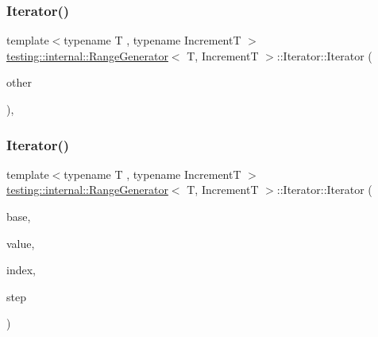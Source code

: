 \mbox{\label{classtesting_1_1internal_1_1_range_generator_1_1_iterator_a14150df56c79ae26f1beaea1e7548ebc}} 
\subsubsection{\texorpdfstring{Iterator()}{Iterator()}\hspace{0.1cm}{\footnotesize\ttfamily [4/6]}}
{\footnotesize\ttfamily template$<$typename T , typename IncrementT $>$ \\
\mbox{\hyperlink{classtesting_1_1internal_1_1_range_generator}{testing\+::internal\+::\+Range\+Generator}}$<$ T, IncrementT $>$\+::Iterator\+::\+Iterator (\begin{DoxyParamCaption}\item[{const \mbox{\hyperlink{classtesting_1_1internal_1_1_range_generator_1_1_iterator}{Iterator}} \&}]{other }\end{DoxyParamCaption})\hspace{0.3cm}{\ttfamily [inline]}, {\ttfamily [private]}}

\mbox{\label{classtesting_1_1internal_1_1_range_generator_1_1_iterator_a960184d2ea0ff223d9cf4d6ab015baa8}} 
\subsubsection{\texorpdfstring{Iterator()}{Iterator()}\hspace{0.1cm}{\footnotesize\ttfamily [5/6]}}
{\footnotesize\ttfamily template$<$typename T , typename IncrementT $>$ \\
\mbox{\hyperlink{classtesting_1_1internal_1_1_range_generator}{testing\+::internal\+::\+Range\+Generator}}$<$ T, IncrementT $>$\+::Iterator\+::\+Iterator (\begin{DoxyParamCaption}\item[{const \mbox{\hyperlink{classtesting_1_1internal_1_1_param_generator_interface}{Param\+Generator\+Interface}}$<$ T $>$ $\ast$}]{base,  }\item[{T}]{value,  }\item[{int}]{index,  }\item[{IncrementT}]{step }\end{DoxyParamCaption})\hspace{0.3cm}{\ttfamily [inline]}}

